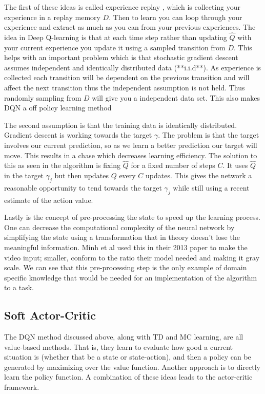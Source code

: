 The first of these ideas is called experience replay \cite{10.5555/168871}, which is collecting your experience in a replay memory $D$. Then to learn you can loop through your experience and extract as much as you can from your previous experiences. The idea in Deep Q-learning is that at each time step rather than updating $\hat{Q}$ with your current experience you update it using a sampled transition from $D$. This helps with an important problem which is that stochastic gradient descent assumes independent and identically distributed data (**i.i.d**). As experience is collected each transition will be dependent on the previous transition and will affect the next transition thus the independent assumption is not held. Thus randomly sampling from $D$ will give you a independent data set. This also makes DQN a off policy learning method

The second assumption is that the training data is identically distributed. Gradient descent is working towards the target $\gamma$. The problem is that the target involves our current prediction, so as we learn a better prediction our target will move. This results in a chase which decreases learning efficiency. The solution to this as seen in the algorithm is fixing $\hat{Q}$ for a fixed number of steps $C$. It uses $\hat{Q}$ in the target $\gamma_{j}$ but then updates $Q$ every $C$ updates. This gives the network a reasonable opportunity to tend towards the target $\gamma_{j}$ while still using a recent estimate of the action value.

Lastly is the concept of pre-processing the state to speed up the learning process. One can decrease the computational complexity of the neural network by simplifying the state using a transformation that in theory doesn't lose the meaningful information. Minh et al used this in their 2013 paper to make the video input; smaller, conform to the ratio their model needed and making it gray scale. We can see that this pre-processing step is the only example of domain specific knowledge that would be needed for an implementation of the algorithm to a task.

\subsection{Soft Actor-Critic}\label{subsec:SAC}

The DQN method discussed above, along with TD and MC learning, are all value-based methods. That is, they learn to evaluate how good a current situation is (whether that be a state or state-action), and then a policy can be generated by maximizing over the value function. Another approach is to directly learn the policy function. A combination of these ideas leads to the actor-critic framework.

